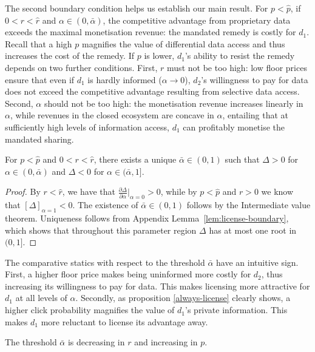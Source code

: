 \noindent The second boundary condition helps us establish our main result. For $p < \hat{p}$, if $0 < r < \hat{r}$ and $\alpha \in (0, \bar{\alpha})$, the competitive advantage from proprietary data exceeds the maximal monetisation revenue: the mandated remedy is costly for $d_1$. Recall that a high $p$ magnifies the value of differential data access and thus increases the cost of the remedy. If $p$ is lower, $d_1$'s ability to resist the remedy depends on two further conditions. First, $r$ must not be too high: low floor prices ensure that even if $d_1$ is hardly informed ($\alpha \to 0$), $d_2$'s willingness to pay for data does not exceed the competitive advantage resulting from selective data access. Second, $\alpha$ should not be too high: the monetisation revenue increases linearly in $\alpha$, while revenues in the closed ecosystem are concave in $\alpha$, entailing that at sufficiently high levels of information access, $d_1$ can profitably monetise the mandated sharing.

\begin{prop}\label{license-gen}
    For $p < \hat{p}$ and $0 < r < \hat{r}$, there exists a unique $\bar{\alpha} \in (0,1)$ such that $\Delta >0$ for $\alpha \in (0,\bar{\alpha})$ and $\Delta <0$ for $\alpha \in (\bar{\alpha},1]$.
\end{prop}
\begin{proof}
    By $r < \hat{r}$, we have that  $\frac{\partial \Delta}{\partial \alpha} \big|_{\alpha = 0} > 0$, while by $p < \hat{p}$ and $r > 0$ we know that $[\Delta]_{\alpha = 1} < 0$. The existence of $\bar{\alpha} \in (0,1)$ follows by the Intermediate value theorem. Uniqueness follows from Appendix Lemma~\ref{lem:license-boundary}, which shows that throughout this parameter region $\Delta$ has at most one root in $(0,1]$.
\end{proof}

\noindent The comparative statics with respect to the threshold $\bar{\alpha}$ have an intuitive sign. First, a higher floor price makes being uninformed more costly for $d_2$, thus increasing its willingness to pay for data. This makes licensing more attractive for $d_1$ at all levels of $\alpha$. Secondly, as proposition \ref{always-license} clearly shows, a higher click probability magnifies the value of $d_1$'s private information. This makes $d_1$ more reluctant to license its advantage away.
\begin{cor}\label{alpha-threshold}
    The threshold $\bar{\alpha}$ is decreasing in $r$ and increasing in $p$.
\end{cor}
\par

